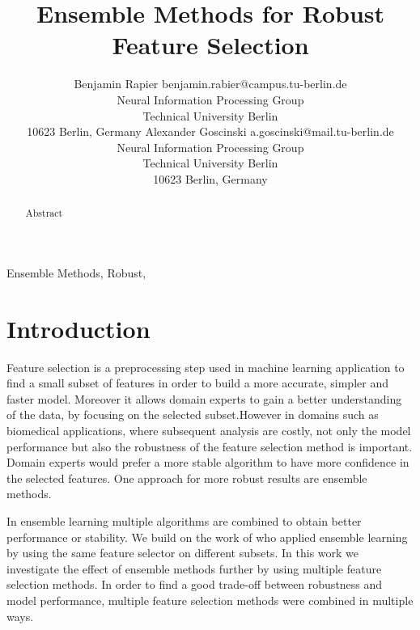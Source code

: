 \documentclass[twoside,11pt]{article}
\begin{document}
\title{Ensemble Methods for Robust Feature Selection}

\author{\name Benjamin Rapier \email benjamin.rabier@campus.tu-berlin.de \\
       \addr Neural Information Processing Group\\
       Technical University Berlin\\
       10623 Berlin, Germany
       \AND
       \name Alexander Goscinski \email a.goscinski@mail.tu-berlin.de \\
       \addr Neural Information Processing Group\\
       Technical University Berlin\\
       10623 Berlin, Germany}


\maketitle

\begin{abstract}%
  Abstract
\end{abstract}

\begin{keywords}
  Ensemble Methods, Robust, 
\end{keywords}

\section{Introduction}

Feature selection is a preprocessing step used in machine learning application to find
a small subset of features in order to build a more accurate, simpler and faster model.
Moreover it allows domain experts to gain a better understanding of the data, by focusing
on the selected subset.However in domains such as biomedical applications, 
where subsequent analysis are costly, not only the model performance but also the robustness
of the feature selection method is important. Domain experts would prefer a more stable
algorithm to have more confidence in the selected features. One approach for more robust
results are ensemble methods.

In ensemble learning multiple algorithms are combined to obtain better performance or stability.
We build on the work of \cite{saeys2008} who applied ensemble learning by using
the same feature selector on different subsets. In this work we investigate the effect of ensemble methods
further by using multiple feature selection methods. 
In order to find a good trade-off between robustness and model performance, multiple feature selection methods were
combined in multiple ways.
\end{document}
